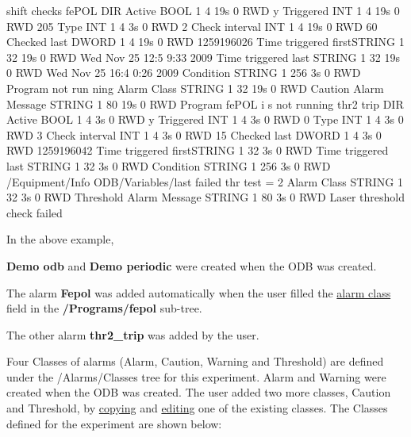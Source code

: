 \begin{DoxyCode}
      shift checks
        fePOL                   DIR
            Active              BOOL    1     4     19s  0   RWD  y
            Triggered           INT     1     4     19s  0   RWD  205
            Type                INT     1     4     3s   0   RWD  2
            Check interval      INT     1     4     19s  0   RWD  60
            Checked last        DWORD   1     4     19s  0   RWD  1259196026
            Time triggered firstSTRING  1     32    19s  0   RWD  Wed Nov 25 12:5
      9:33 2009
            Time triggered last STRING  1     32    19s  0   RWD  Wed Nov 25 16:4
      0:26 2009
            Condition           STRING  1     256   3s   0   RWD  Program not run
      ning
            Alarm Class         STRING  1     32    19s  0   RWD  Caution
            Alarm Message       STRING  1     80    19s  0   RWD  Program fePOL i
      s not running
        thr2 trip               DIR
            Active              BOOL    1     4     3s   0   RWD  y
            Triggered           INT     1     4     3s   0   RWD  0
            Type                INT     1     4     3s   0   RWD  3
            Check interval      INT     1     4     3s   0   RWD  15
            Checked last        DWORD   1     4     3s   0   RWD  1259196042
            Time triggered firstSTRING  1     32    3s   0   RWD
            Time triggered last STRING  1     32    3s   0   RWD
            Condition           STRING  1     256   3s   0   RWD  /Equipment/Info
       ODB/Variables/last failed thr test = 2
            Alarm Class         STRING  1     32    3s   0   RWD  Threshold
            Alarm Message       STRING  1     80    3s   0   RWD  Laser threshold
       check failed
\end{DoxyCode}


In the above example,
\begin{DoxyItemize}
\item {\bfseries Demo odb} and {\bfseries Demo periodic} were created when the ODB was created.
\item The alarm {\bfseries Fepol} was added automatically when the user filled the \hyperlink{RC_customize_ODB_RC_programs_Alarm_class}{alarm class} field in the {\bfseries /Programs/fepol} sub-\/tree.
\item The other alarm {\bfseries thr2\_\-trip} was added by the user. \par

\end{DoxyItemize}

Four Classes of alarms (Alarm, Caution, Warning and Threshold) are defined under the /Alarms/Classes tree for this experiment. Alarm and Warning were created when the ODB was created. The user added two more classes, Caution and Threshold, by \hyperlink{RC_odbedit_examples_RC_odbedit_copy}{copying} and \hyperlink{RC_odbedit_examples_RC_odbedit_set}{editing} one of the existing classes. The Classes defined for the experiment are shown below:


